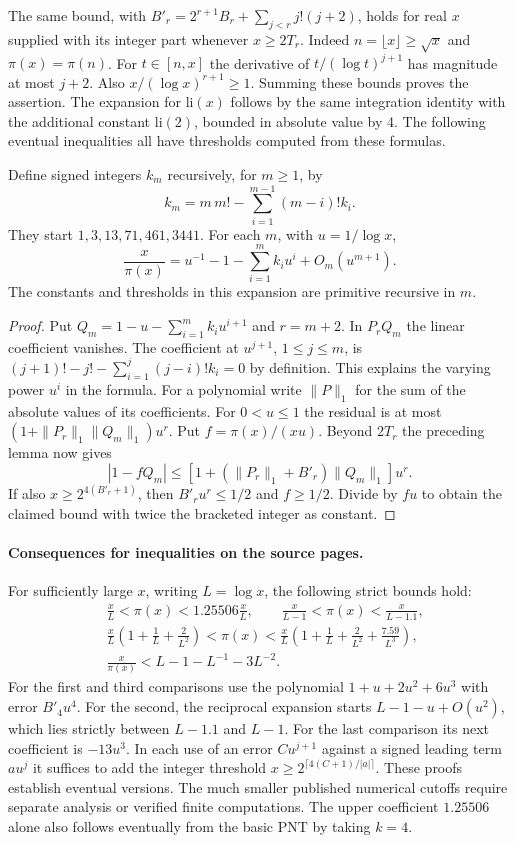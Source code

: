 The same bound, with $B'_r=2^{r+1}B_r+\sum_{j<r}j!(j+2)$, holds for real $x$ supplied with its integer part whenever $x\ge2T_r$. Indeed $n=\lfloor x\rfloor\ge\sqrt{x}$ and $\pi(x)=\pi(n)$. For $t\in[n,x]$ the derivative of $t/(\log t)^{j+1}$ has magnitude at most $j+2$. Also $x/(\log x)^{r+1}\ge1$. Summing these bounds proves the assertion. The expansion for $\mathrm{li}(x)$ follows by the same integration identity with the additional constant $\mathrm{li}(2)$, bounded in absolute value by 4. The following eventual inequalities all have thresholds computed from these formulas.

\begin{proposition}\label{prop:growthrecip}
Define signed integers $k_m$ recursively, for $m\ge1$, by
\[
 k_m=m\,m!-\sum_{i=1}^{m-1}(m-i)!k_i.
\]
They start $1,3,13,71,461,3441$. For each $m$, with $u=1/\log x$,
\[
 \frac{x}{\pi(x)}
 =u^{-1}-1-\sum_{i=1}^m k_i u^i+O_m(u^{m+1}).
\]
The constants and thresholds in this expansion are primitive recursive in $m$.
\end{proposition}
\begin{proof}
Put $Q_m=1-u-\sum_{i=1}^m k_i u^{i+1}$ and $r=m+2$. In $P_r Q_m$ the linear coefficient vanishes. The coefficient at $u^{j+1}$, $1\le j\le m$, is $(j+1)!-j!-\sum_{i=1}^j(j-i)!k_i=0$ by definition. This explains the varying power $u^i$ in the formula. For a polynomial write $\|P\|_1$ for the sum of the absolute values of its coefficients. For $0<u\le1$ the residual is at most $(1+\|P_r\|_1\|Q_m\|_1)u^r$. Put $f=\pi(x)/(xu)$. Beyond $2T_r$ the preceding lemma now gives
\[
 |1-fQ_m|\le [1+(\|P_r\|_1+B'_r)\|Q_m\|_1]u^r.
\]
If also $x\ge2^{4(B'_r+1)}$, then $B'_ru^r\le1/2$ and $f\ge1/2$. Divide by $fu$ to obtain the claimed bound with twice the bracketed integer as constant.
\end{proof}

\paragraph{Consequences for inequalities on the source pages.}
For sufficiently large $x$, writing $L=\log x$, the following strict bounds hold:
\begin{align*}
 &\frac{x}{L}<\pi(x)<1.25506\frac{x}{L},\qquad
 \frac{x}{L-1}<\pi(x)<\frac{x}{L-1.1},\\
 &\frac{x}{L}\left(1+\frac1L+\frac2{L^2}\right)<\pi(x)
 <\frac{x}{L}\left(1+\frac1L+\frac2{L^2}+\frac{7.59}{L^3}\right),\\
 &\frac{x}{\pi(x)}< L-1-L^{-1}-3L^{-2}.
\end{align*}
For the first and third comparisons use the polynomial $1+u+2u^2+6u^3$ with error $B'_4u^4$. For the second, the reciprocal expansion starts $L-1-u+O(u^2)$, which lies strictly between $L-1.1$ and $L-1$. For the last comparison its next coefficient is $-13u^3$. In each use of an error $Cu^{j+1}$ against a signed leading term $au^j$ it suffices to add the integer threshold $x\ge2^{\lceil4(C+1)/|a|\rceil}$. These proofs establish eventual versions. The much smaller published numerical cutoffs require separate analysis or verified finite computations. The upper coefficient $1.25506$ alone also follows eventually from the basic PNT by taking $k=4$.

